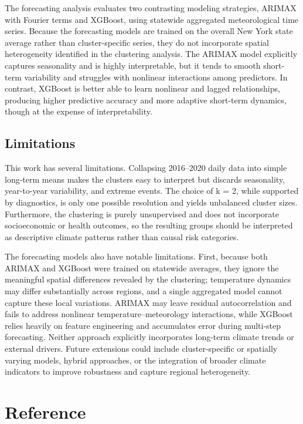 \documentclass[
]{article}
\begin{document}
The forecasting analysis evaluates two contrasting modeling strategies,
ARIMAX with Fourier terms and XGBoost, using statewide aggregated
meteorological time series. Because the forecasting models are trained
on the overall New York state average rather than cluster-specific
series, they do not incorporate spatial heterogeneity identified in the
clustering analysis. The ARIMAX model explicitly captures seasonality
and is highly interpretable, but it tends to smooth short-term
variability and struggles with nonlinear interactions among predictors.
In contrast, XGBoost is better able to learn nonlinear and lagged
relationships, producing higher predictive accuracy and more adaptive
short-term dynamics, though at the expense of interpretability.

\subsection{Limitations}\label{limitations}

This work has several limitations. Collapsing 2016--2020 daily data into
simple long-term means makes the clusters easy to interpret but discards
seasonality, year-to-year variability, and extreme events. The choice of
k = 2, while supported by diagnostics, is only one possible resolution
and yields unbalanced cluster sizes. Furthermore, the clustering is
purely unsupervised and does not incorporate socioeconomic or health
outcomes, so the resulting groups should be interpreted as descriptive
climate patterns rather than causal risk categories.

The forecasting models also have notable limitations. First, because
both ARIMAX and XGBoost were trained on statewide averages, they ignore
the meaningful spatial differences revealed by the clustering;
temperature dynamics may differ substantially across regions, and a
single aggregated model cannot capture these local variations. ARIMAX
may leave residual autocorrelation and fails to address nonlinear
temperature--meteorology interactions, while XGBoost relies heavily on
feature engineering and accumulates error during multi-step forecasting.
Neither approach explicitly incorporates long-term climate trends or
external drivers. Future extensions could include cluster-specific or
spatially varying models, hybrid approaches, or the integration of
broader climate indicators to improve robustness and capture regional
heterogeneity.

\section{\texorpdfstring{\textbf{Reference}}{Reference}}\label{reference}
\end{document}
